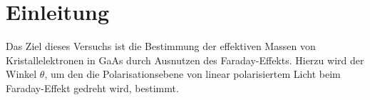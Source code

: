 \section{Einleitung}
Das Ziel dieses Versuchs ist die Bestimmung der effektiven Massen von Kristallelektronen in GaAs durch Ausnutzen des Faraday-Effekts. Hierzu wird der Winkel $\theta$, um den die Polarisationsebene von linear polarisiertem Licht beim Faraday-Effekt gedreht wird, bestimmt.
